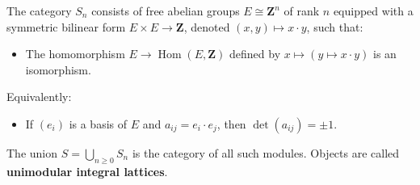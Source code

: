 The category $S_n$ consists of free abelian groups $E \cong \mathbf{Z}^n$ of rank $n$ equipped with a symmetric bilinear form $E \times E \to \mathbf{Z}$, denoted $(x, y) \mapsto x \cdot y$, such that:
\begin{itemize}
\item[(i)] The homomorphism $E \to \operatorname{Hom}(E, \mathbf{Z})$ defined by $x \mapsto (y \mapsto x \cdot y)$ is an isomorphism.
\end{itemize}
Equivalently:
\begin{itemize}
\item[(ii)] If $(e_i)$ is a basis of $E$ and $a_{ij} = e_i \cdot e_j$, then $\det(a_{ij}) = \pm 1$.
\end{itemize}
The union $S = \bigcup_{n \geq 0} S_n$ is the category of all such modules. Objects are called \textbf{unimodular integral lattices}.
